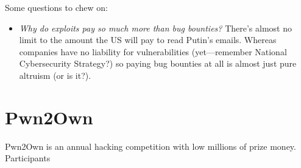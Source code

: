 \documentclass[11pt]{article}
\begin{document}
Some questions to chew on:
\begin{itemize}
    \item {\it Why do exploits pay so much more than bug bounties?} There's almost no limit to the amount the US will pay to read Putin's emails. Whereas companies have no liability for vulnerabilities (yet---remember National Cybersecurity Strategy?) so paying bug bounties at all is almost just pure altruism (or is it?).
\end{itemize}

\section{Pwn2Own}

Pwn2Own is an annual hacking competition with low millions of prize money. Participants
\end{document}

